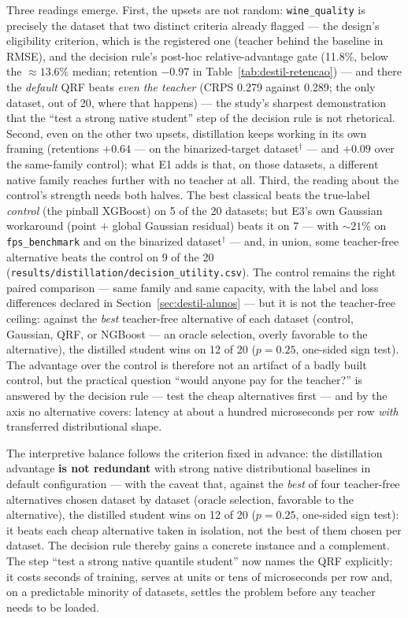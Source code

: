 Three readings emerge. First, the upsets are not random:
\texttt{wine\_quality} is precisely the dataset that two distinct
criteria already flagged --- the design's eligibility criterion,
which is the registered one (teacher behind the baseline in RMSE),
and the decision rule's post-hoc relative-advantage gate (11.8\%,
below the ${\approx}13.6\%$ median; retention $-0.97$ in
Table~\ref{tab:destil-retencao}) --- and there the \emph{default} QRF
beats \emph{even the teacher} (CRPS 0.279 against 0.289; the only
dataset, out of 20, where that happens) --- the study's sharpest
demonstration that the ``test a strong native student'' step of the
decision rule is not rhetorical. Second, even on the other two
upsets, distillation keeps working in its own framing (retentions
$+0.64$ --- on the binarized-target dataset$^\dagger$ --- and
$+0.09$ over the same-family control); what E1 adds is that, on
those datasets, a different native family reaches further with no
teacher at all. Third, the reading about the control's strength
needs both halves. The best classical beats the true-label
\emph{control} (the pinball XGBoost) on 5 of the 20 datasets; but
E3's own Gaussian workaround (point $+$ global Gaussian residual)
beats it on 7 --- with ${\sim}21\%$ on
\texttt{fps\_\allowbreak benchmark} and on the binarized
dataset$^\dagger$ --- and, in union, some teacher-free alternative
beats the control on 9 of the 20
(\texttt{results/\allowbreak distillation/\allowbreak decision\_\allowbreak utility.csv}).
The control remains the right paired comparison --- same family and
same capacity, with the label and loss differences declared in
Section~\ref{sec:destil-alunos} --- but it is not the teacher-free
ceiling: against the \emph{best} teacher-free alternative of each
dataset (control, Gaussian, QRF, or NGBoost --- an oracle selection,
overly favorable to the alternative), the distilled student wins on
12 of 20 ($p=0.25$, one-sided sign test). The advantage over the control is therefore not
an artifact of a badly built control, but the practical question
``would anyone pay for the teacher?'' is answered by the decision
rule --- test the cheap alternatives first --- and by the axis no
alternative covers: latency at about a hundred microseconds per row
\emph{with} transferred distributional shape.

The interpretive balance follows the criterion fixed in advance: the
distillation advantage \textbf{is not redundant} with strong native
distributional baselines in default configuration --- with the
caveat that, against the \emph{best} of four teacher-free
alternatives chosen dataset by dataset (oracle selection, favorable
to the alternative), the distilled student wins on 12 of 20
($p=0.25$, one-sided sign test): it beats each cheap alternative
taken in isolation, not the best of them chosen per dataset. The decision rule thereby gains a
concrete instance and a complement. The step ``test a strong native
quantile student'' now names the QRF explicitly: it costs seconds of
training, serves at units or tens of microseconds per row and, on a
predictable minority of datasets, settles the problem before any
teacher needs to be loaded.

